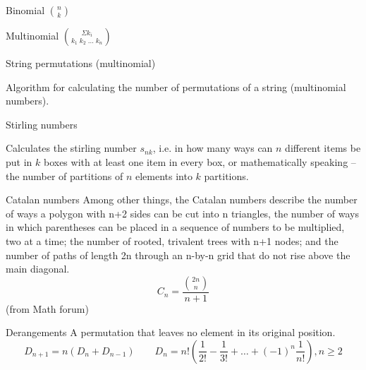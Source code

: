 

\begin{algorithm}{Binomial $\binom{n}{k}$}
\end{algorithm}

\begin{algorithm}{Multinomial $\binom{\Sigma k_i}{k_1\;k_2\;\ldots\;k_n}$}
\end{algorithm}

\begin{algorithm}{String permutations (multinomial)}

Algorithm for calculating the number of permutations of a string
(multinomial numbers).
\end{algorithm}

\begin{algorithm}{Stirling numbers}

Calculates the stirling number $s_{nk}$, i.e. in how many ways can $n$
different items be put in $k$ boxes with at least one item in every box, or
mathematically speaking -- the number of partitions of $n$ elements into
$k$ partitions.
\end{algorithm}

\begin{algorithm}{Catalan numbers}
\keyword{}
Among other things, the Catalan numbers describe the number of ways a polygon
with n+2 sides can be cut into n triangles, the number of ways in which
parentheses can be placed in a sequence of numbers to be multiplied, two at
a time; the number of rooted, trivalent trees with n+1 nodes; and the number
of paths of length 2n through an n-by-n grid that do not rise above the
main diagonal.
$$ C_n = \frac{\binom{2n}{n}}{\scriptstyle n+1} $$
(from Math forum)
\end{algorithm}

\begin{algorithm}{Derangements}
\keyword{}
A permutation that leaves no element in its original position.
$$D_{n+1}=n(D_n+D_{n-1})
\qquad
D_n=n!\left(\frac 1{2!}-\frac 1{3!}+\ldots+(-1)^n\frac 1{n!}\right), n\ge 2$$
\end{algorithm}
